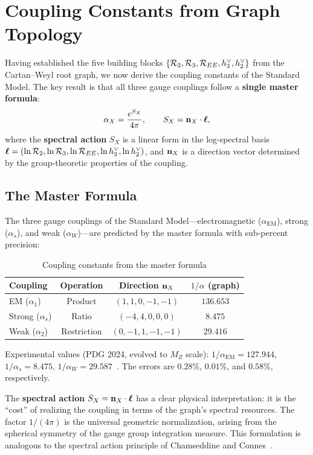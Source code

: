 \section{Coupling Constants from Graph Topology}\label{sec:coupling_constants}

Having established the five building blocks $\{\mathcal{R}_2, \mathcal{R}_3, \mathcal{R}_{EE}, h^\vee_3, h^\vee_2\}$ from the Cartan--Weyl root graph, we now derive the coupling constants of the Standard Model. The key result is that all three gauge couplings follow a \textbf{single master formula}:
\begin{equation}
\alpha_X = \frac{e^{S_X}}{4\pi}, \qquad S_X = \mathbf{n}_X \cdot \boldsymbol{\ell},
\end{equation}
where the \textbf{spectral action} $S_X$ is a linear form in the
log-spectral basis $\boldsymbol{\ell} = (\ln\mathcal{R}_2, \ln\mathcal{R}_3, \ln\mathcal{R}_{EE},
\ln h^\vee_3, \ln h^\vee_2)$, and $\mathbf{n}_X$ is a direction vector determined by
the group-theoretic properties of the coupling.

\subsection{The Master Formula}\label{sec:master_formula}

The three gauge couplings of the Standard Model---electromagnetic ($\alpha_{\mathrm{EM}}$), strong ($\alpha_s$), and weak ($\alpha_W$)—are predicted by the master formula with sub-percent precision:

\begin{table}[h]
\centering
\caption{Coupling constants from the master formula}
\label{tab:coup_constants}
\begin{tabular}{lccc}
\hline\hline
Coupling & Operation & Direction $\mathbf{n}_X$ & $1/\alpha$ (graph) \\
\hline
EM ($\alpha_1$) & Product & $(1, 1, 0, -1, -1)$ & $136.653$ \\
Strong ($\alpha_s$) & Ratio & $(-4, 4, 0, 0, 0)$ & $8.475$ \\
Weak ($\alpha_2$) & Restriction & $(0, -1, 1, -1, -1)$ & $29.416$ \\
\hline\hline
\end{tabular}
\end{table}

Experimental values (PDG 2024, evolved to $M_Z$ scale): $1/\alpha_{\mathrm{EM}} = 127.944$, $1/\alpha_s = 8.475$, $1/\alpha_W = 29.587$~\cite{pdg2024}. The errors are $0.28\%$, $0.01\%$, and $0.58\%$, respectively.

The \textbf{spectral action} $S_X = \mathbf{n}_X \cdot \boldsymbol{\ell}$ has a clear physical interpretation: it is the ``cost'' of realizing the coupling in terms of the graph's spectral resources. The factor $1/(4\pi)$ is the universal geometric normalization, arising from the spherical symmetry of the gauge group integration measure. This formulation is analogous to the spectral action principle of Chamseddine and Connes~\cite{chamseddine1997spectral}.

